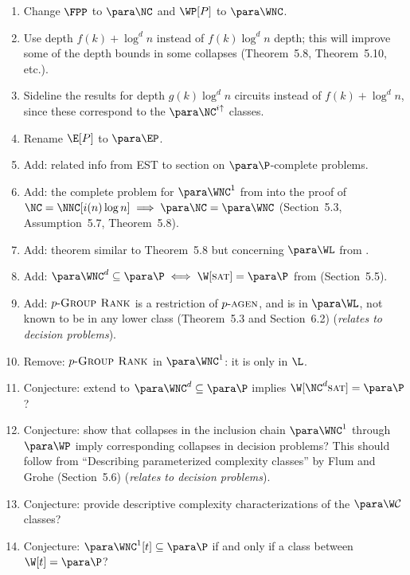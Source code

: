 \documentclass[draft]{article}
\newcommand{\dash}{\textnormal{-}}
\begin{document}
\begin{enumerate}
\item Change $\FPP$ to $\para \NC$ and $\WP[P]$ to $\para \WNC$.
\item Use depth $f(k) + \log^d n$ instead of $f(k) \log^d n$ depth; this will improve some of the depth bounds in some collapses (Theorem~5.8, Theorem~5.10, etc.).
\item Sideline the results for depth $g(k) \log^d n$ circuits instead of $f(k) + \log^d n$, since these correspond to the $\para \NC^{i\uparrow}$ classes.
\item Rename $\E[P]$ to $\para \EP$.
\item Add: related info from EST to section on $\para \P$-complete problems.
\item Add: the complete problem for $\para \WNC^1$ from \autocite{est15} into the proof of $\NC = \NNC[i(n) \log n] \implies \para \NC = \para \WNC$ (Section~5.3, Assumption~5.7, Theorem~5.8).
\item Add: theorem similar to Theorem~5.8 but concerning $\para \WL$ from \autocite{cm14}.
\item Add: $\para \WNC^d \subseteq \para \P \iff \W[\textsc{sat}] = \para \P$ from \autocite[Corollary~3.8]{est15} (Section~5.5).
\item Add: $p \dash \textsc{Group Rank}$ is a restriction of $p \dash \textsc{agen}$, and is in $\para \WL$, not known to be in any lower class (Theorem~5.3 and Section~6.2) (\emph{relates to decision problems}).
\item Remove: $p \dash \textsc{Group Rank}$ in $\para \WNC^1$: it is only in $\L$.
\item Conjecture: extend \autocite[Corollary~3.8]{est15} to $\para \WNC^d \subseteq \para \P$ implies $\W[\NC^d \textsc{sat}] = \para \P$?
\item Conjecture: show that collapses in the inclusion chain $\para \WNC^1$ through $\para \WP$ imply corresponding collapses in decision problems? This should follow from ``Describing parameterized complexity classes'' by Flum and Grohe (Section~5.6) (\emph{relates to decision problems}).
\item Conjecture: provide descriptive complexity characterizations of the $\para \W \mathcal{C}$ classes?
\item Conjecture: $\para \WNC^1[t] \subseteq \para \P$ if and only if a class between $\W[t] = \para \P$?
\end{enumerate}

\printbibliography
\end{document}
